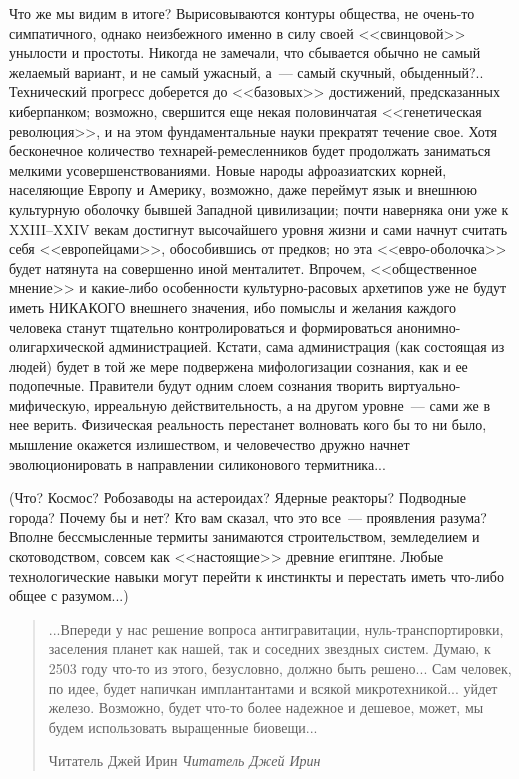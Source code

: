 \documentclass{scrbook}
\makeatletter
\newcommand{\flqq}{<<}
\newcommand{\frqq}{>>}
\newcommand{\mdash}{~--- }
\newcommand{\ndash}{--}
\newcommand{\inlineauthor}[1]{\emph{#1}}
\newcommand{\myquotation}[2][\@empty]{
	\begin{quotation}
	#2

	\ifx\@empty#1
	\else
		\nopagebreak	
		\inlineauthor{#1}
	\fi
	\end{quotation}
}
\makeatother
\begin{document}
Что же мы видим в итоге? Вырисовываются контуры общества, не очень-то симпатичного, однако неизбежного именно в силу своей {\flqq}свинцовой{\frqq} унылости и простоты. Никогда не замечали, что сбывается обычно не самый желаемый вариант, и не самый ужасный, а{\mdash}самый скучный, обыденный?.. Технический прогресс доберется до {\flqq}базовых{\frqq} достижений, предсказанных киберпанком; возможно, свершится еще некая половинчатая {\flqq}генетическая революция{\frqq}, и на этом фундаментальные науки прекратят течение свое. Хотя бесконечное количество технарей-ремесленников будет продолжать заниматься мелкими усовершенствованиями. Новые народы афроазиатских корней, населяющие Европу и Америку, возможно, даже переймут язык и внешнюю культурную оболочку бывшей Западной цивилизации; почти наверняка они уже к XXIII{\ndash}XXIV векам достигнут высочайшего уровня жизни и сами начнут считать себя {\flqq}европейцами{\frqq}, обособившись от предков; но эта {\flqq}евро-оболочка{\frqq} будет натянута на совершенно иной менталитет. Впрочем, {\flqq}общественное мнение{\frqq} и какие-либо особенности культурно-расовых архетипов уже не будут иметь НИКАКОГО внешнего значения, ибо помыслы и желания каждого человека станут тщательно контролироваться и формироваться анонимно-олигархической администрацией. Кстати, сама администрация (как состоящая из людей) будет в той же мере подвержена мифологизации сознания, как и ее подопечные. Правители будут одним слоем сознания творить виртуально-мифическую, ирреальную действительность, а на другом уровне{\mdash}сами же в нее верить. Физическая реальность перестанет волновать кого бы то ни было, мышление окажется излишеством, и человечество дружно начнет эволюционировать в направлении силиконового термитника...

(Что? Космос? Робозаводы на астероидах? Ядерные реакторы? Подводные города? Почему бы и нет? Кто вам сказал, что это все{\mdash}проявления разума? Вполне бессмысленные термиты занимаются строительством, земледелием и скотоводством, совсем как {\flqq}настоящие{\frqq} древние египтяне. Любые технологические навыки могут перейти к инстинкты и перестать иметь что-либо общее с разумом...)

\myquotation[Читатель Джей Ирин]{...Впереди у нас решение вопроса антигравитации, нуль-транспортировки, заселения планет как нашей, так и соседних звездных систем. Думаю, к 2503 году что-то из этого, безусловно, должно быть решено... Сам человек, по идее, будет напичкан имплантантами и всякой микротехникой... уйдет железо. Возможно, будет что-то более надежное и дешевое, может, мы будем использовать выращенные биовещи...}
\end{document}
